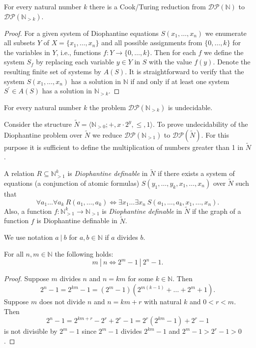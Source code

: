 \documentclass{jgcc} %
\theoremstyle{plain}\newtheorem{satz}[thm]{Satz} %
\begin{document}
\begin{lem} \label{rest_dp}
For every natural number $k$ there is a Cook/Turing reduction from $\mathcal{DP}(\mathbb{N})$ to $\mathcal{DP}(\mathbb{N}_{>k})$.
\end{lem}
\begin{proof}
For a given system of Diophantine equations $S(x_1,\ldots,x_n)$ we 
enumerate all subsets $Y$ of $X = \{ x_1, \ldots, x_n \}$ and 
all possible assignments from $\{ 0, \ldots, k \}$ for the variables in $Y$, 
i.e., functions $f : Y \rightarrow \{ 0, \ldots, k \}$. 
Then for each $f$ we define the system $S_f$ by replacing each variable $y \in Y$ in $S$ with the value $f(y)$.
Denote the resulting finite set of systems by $A(S)$.
It is straightforward to verify that the system $S(x_1,\ldots,x_n)$ has a solution in $\mathbb{N}$ if and only if 
at least one system $S^{\prime} \in A(S)$ has a solution in $\mathbb{N}_{>k}$.
\end{proof}

\begin{cor} \label{dpk_undec}
For every natural number $k$ the problem $\mathcal{DP}(\mathbb{N}_{>k})$ is undecidable.
\end{cor}

Consider the structure $\widetilde{N} = \langle \mathbb{N}_{>0}; +, x \cdot 2^y, \leq, 1 \rangle$.
To prove undecidability of the Diophantine problem over $\widetilde{N}$ we reduce $\mathcal{DP}(\mathbb{N}_{>1})$ 
to $\mathcal{DP}(\widetilde{N})$.
For this purpose it is sufficient to define the multiplication of numbers greater than 1 in $\widetilde{N}$.

A relation $R \subseteq \mathbb{N}_{>1}^k$ is {\it Diophantine definable} in $\widetilde{N}$ if there exists a system of equations
(a conjunction of atomic formulas)
$S(y_1, \ldots, y_k, x_1, \ldots, x_n)$ over $\widetilde{N}$ such that
$$
\forall a_1 \ldots \forall a_k\ R(a_1, \ldots, a_k) \Leftrightarrow 
\exists x_1 \ldots \exists x_n\ S(a_1, \ldots, a_k, x_1, \ldots, x_n).
$$
Also, a function $f : \mathbb{N}_{>1}^k \rightarrow \mathbb{N}_{>1}$ is {\it Diophantine definable} in $\widetilde{N}$ if the graph of
a function $f$ is Diophantine definable in $\widetilde{N}$.

We use notation $a\ |\ b$ for $a,b \in \mathbb{N}$ if $a$ divides $b$.

\begin{lem} \label{power2}
For all $n,m \in \mathbb{N}$ the following holds:
$$
m\ |\ n \Leftrightarrow 2^m-1\ |\ 2^n - 1.
$$
\end{lem}
\begin{proof}
Suppose $m$ divides $n$ and $n = km$ for some $k \in \mathbb{N}$. Then
$$
2^n - 1 = 2^{km} - 1 = (2^m - 1)(2^{m (k-1)} + \ldots + 2^m + 1).
$$
Suppose $m$ does not divide $n$ and $n = km + r$ with natural $k$ and $0 < r < m$. Then
$$
2^n - 1 = 2^{km+r} - 2^r + 2^r - 1 = 2^r (2^{km} - 1) + 2^r - 1
$$
is not divisible by $2^m - 1$ since $2^m - 1$ divides $2^{km} - 1$ and $2^m - 1 > 2^r - 1 > 0$.
\end{proof}
\end{document}
